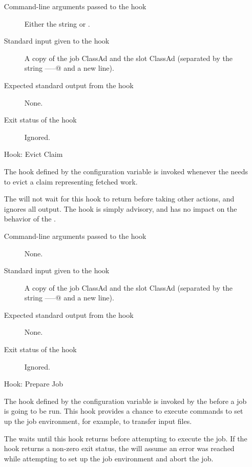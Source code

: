 \begin{itemize}
\begin{description}
\item[Command-line arguments passed to the hook]
  Either the string \verb@accept@ or \verb@reject@.

\item[Standard input given to the hook]
  A copy of the job ClassAd and the slot ClassAd
  (separated by the string \verb@-----@ and a new line).

\item[Expected standard output from the hook]
  None.

\item[Exit status of the hook]
  Ignored.
\end{description}


\item[Hook: Evict Claim]

The hook defined by the configuration variable
 is invoked whenever the 
needs to evict a claim representing fetched work.

The  will not wait for this hook to return before
taking other actions, and ignores all output.
The hook is simply advisory, and has no impact on the behavior of the
.

\begin{description}
\item[Command-line arguments passed to the hook]
  None.

\item[Standard input given to the hook]
  A copy of the job ClassAd and the slot ClassAd
  (separated by the string \verb@-----@ and a new line).

\item[Expected standard output from the hook]
  None.

\item[Exit status of the hook]
  Ignored.
\end{description}


\item[Hook: Prepare Job]

The hook defined by the configuration variable
 is invoked by the  before
a job is going to be run.
This hook provides a chance to execute commands to set up the job
environment, for example, to transfer input files.

The  waits until this hook returns before
attempting to execute the job.
If the hook returns a non-zero exit status, the  will
assume an error was reached while attempting to set up the job
environment and abort the job.


\end{itemize}
